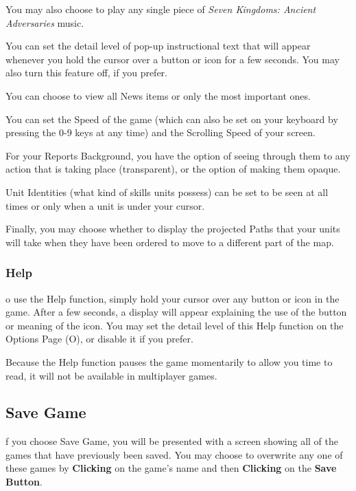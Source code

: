 You may also choose to play any single piece of \textit{Seven Kingdoms: Ancient Adversaries} music.


You can set the detail level of pop-up instructional text that will appear whenever you hold the cursor over a button or icon for a few seconds. You may also turn this feature off, if you prefer.

You can choose to view all News items or only the most important ones.


You can set the Speed of the game (which can also be set on your keyboard by pressing the 0-9 keys at any time) and the Scrolling Speed of your screen.

For your Reports Background, you have the option of seeing through them to any action that is taking place (transparent), or the option of making them opaque.

Unit Identities (what kind of skills units possess) can be set to be seen at all times or only when a unit is under your cursor.

Finally, you may choose whether to display the projected Paths that your units will take when they have been ordered to move to a different part of the map.

\subsubsection{Help}



o use the Help function, simply hold your cursor over any button or icon in the game. After a few seconds, a display will appear explaining the use of the button or meaning of the icon. You may set the detail level of this Help function on the Options Page (O), or disable it if you prefer.

Because the Help function pauses the game momentarily to allow you time to read, it will not be available in multiplayer games.

\subsection{Save Game}


f you choose Save Game, you will be presented with a screen showing all of the games that have previously been saved. You may choose to overwrite any one of these games by \textbf{Clicking} on the game’s name and then \textbf{Clicking} on the \textbf{Save Button}.

